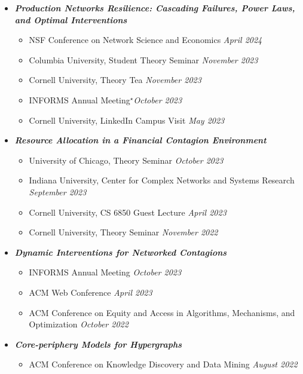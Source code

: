 \documentclass[margin]{res}
\newcommand{\presentedbycoauthor}[0]{\ensuremath {^{\star}}}
\newcommand{\bemph}[1]{\textbf{\emph{#1}}}
\begin{document}
\begin{resume}
\begin{itemize}[nosep]
	\item \bemph{Production Networks Resilience: Cascading Failures, Power Laws, and Optimal Interventions}
	\begin{itemize}[nosep]
		\item NSF Conference on Network Science and Economics \hfill \emph{April 2024}
		\item Columbia University, Student Theory Seminar \hfill \emph{November 2023}
		\item Cornell University, Theory Tea \hfill \emph{November 2023}
		\item INFORMS Annual Meeting\presentedbycoauthor \hfill \emph{October 2023}
		\item Cornell University, LinkedIn Campus Visit \hfill \emph{May 2023}
	\end{itemize}

	\item \bemph{Resource Allocation in a Financial Contagion Environment}
	\begin{itemize}[nosep]
		\item University of Chicago, Theory Seminar \hfill \emph{October 2023}
		\item Indiana University, Center for Complex Networks and Systems Research \\ \hfill \emph{September 2023} 
		\item Cornell University, CS 6850 Guest Lecture \hfill \emph{April 2023}
		\item Cornell University, Theory Seminar \hfill \emph{November 2022}
	\end{itemize}
	
	\item \bemph{Dynamic Interventions for Networked Contagions}
	\begin{itemize}[nosep]
		\item INFORMS Annual Meeting \hfill \emph{October 2023}
		\item ACM Web Conference \hfill \emph{April 2023}	
		\item ACM Conference on Equity and Access in Algorithms, Mechanisms, and Optimization \hfill \emph{October 2022}
	\end{itemize}

	\item \bemph{Core-periphery Models for Hypergraphs}
	\begin{itemize}[nosep]
		\item ACM Conference on Knowledge Discovery and Data Mining \hfill \emph{August 2022}
	\end{itemize}
	

\end{itemize}
\end{resume}
\end{document}
